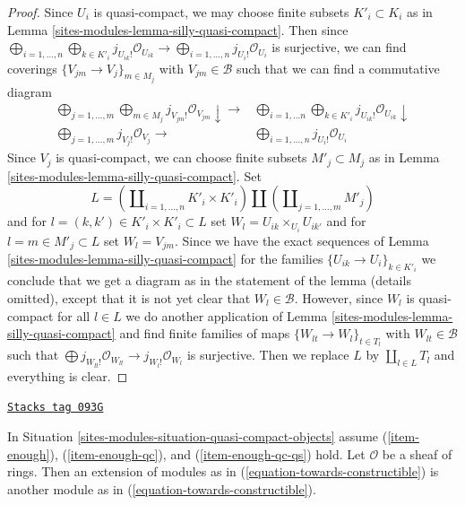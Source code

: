 \begin{proof}
Since $U_i$ is quasi-compact, we may choose finite subsets $K'_i \subset K_i$
as in Lemma \ref{sites-modules-lemma-silly-quasi-compact}.
Then since
$\bigoplus_{i = 1, \ldots, n}
\bigoplus_{k \in K'_i} j_{U_{ik}!}\mathcal{O}_{U_{ik}} \to
\bigoplus_{i = 1, \ldots, n} j_{U_i!}\mathcal{O}_{U_i}$ is surjective,
we can find coverings $\{V_{jm} \to V_j\}_{m \in M_j}$ with
$V_{jm} \in \mathcal{B}$ such that we can find a commutative diagram
$$
\begin{array}{cc}\bigoplus_{j = 1, \ldots, m} \bigoplus_{m \in M_j}
j_{V_{jm}!}\mathcal{O}_{V_{jm}} \downarrow\longrightarrow & \bigoplus_{i = 1, \ldots n} \bigoplus_{k \in K'_i}
j_{U_{ik}!}\mathcal{O}_{U_{ik}} \downarrow \\ \bigoplus_{j = 1, \ldots, m} j_{V_j!}\mathcal{O}_{V_j} \longrightarrow & \bigoplus_{i = 1, \ldots, n} j_{U_i!}\mathcal{O}_{U_i}\end{array}
$$
Since $V_j$ is quasi-compact, we can choose finite subsets
$M'_j \subset M_j$ as in Lemma \ref{sites-modules-lemma-silly-quasi-compact}.
Set
$$
L = \left(\coprod\nolimits_{i = 1, \ldots, n} K'_i \times K'_i \right)
\coprod
\left(\coprod\nolimits_{j = 1, \ldots, m} M'_j\right)
$$
and for $l = (k, k') \in K'_i \times K'_i \subset L$ set
$W_l = U_{ik} \times_{U_i} U_{ik'}$ and for
$l = m \in M'_j \subset L$ set $W_l = V_{jm}$.
Since we have the exact sequences of Lemma \ref{sites-modules-lemma-silly-quasi-compact}
for the families $\{U_{ik} \to U_i\}_{k \in K'_i}$
we conclude that we get a diagram as in the statement of the lemma
(details omitted), except that it is not yet clear that $W_l \in \mathcal{B}$.
However, since $W_l$ is quasi-compact for all $l \in L$
we do another application of Lemma \ref{sites-modules-lemma-silly-quasi-compact}
and find finite families of maps $\{W_{lt} \to W_l\}_{t \in T_l}$
with $W_{lt} \in \mathcal{B}$ such that
$\bigoplus j_{W_{lt}!}\mathcal{O}_{W_{lt}} \to j_{W_l!}\mathcal{O}_{W_l}$
is surjective. Then we replace $L$ by $\coprod_{l \in L} T_l$
and everything is clear.
\end{proof}

\begin{lemma}
\label{sites-modules-lemma-extension-towards-constructibles}
\href{https://stacks.math.columbia.edu/tag/093G}{\texttt{Stacks tag 093G}}

In Situation \ref{sites-modules-situation-quasi-compact-objects} assume
(\ref{item-enough}), (\ref{item-enough-qc}), and (\ref{item-enough-qc-qs})
hold. Let $\mathcal{O}$ be a sheaf of rings.
Then an extension of modules as in (\ref{equation-towards-constructible})
is another module as in (\ref{equation-towards-constructible}).
\end{lemma}

